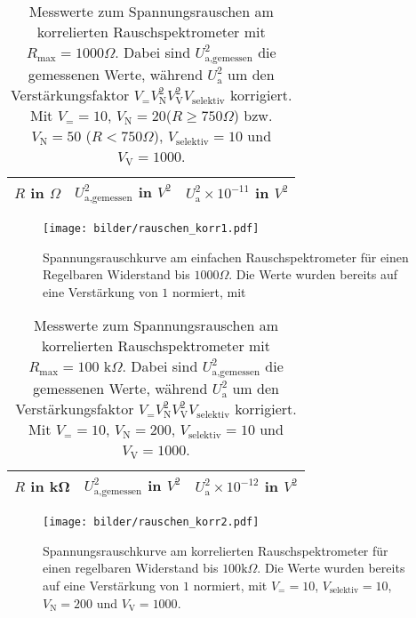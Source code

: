 		\begin{table}[h]
			\centering
			\begin{tabular}{ccc}
				\toprule \midrule
				$R$ in $\Omega$ & $U_\text{a,gemessen}^2$ in $V^2$
				& $U_\text{a}^2 \times 10^{-11}$ in $V^2$\\
				\midrule
				
				\midrule \bottomrule
			\end{tabular}
			\caption{Messwerte zum Spannungsrauschen am korrelierten
			Rauschspektrometer mit $R_\text{max}=1000 \Omega$. Dabei sind
			$U_\text{a,gemessen}^2$ die gemessenen Werte, während $U_\text{a}^2$ um den
			Verstärkungsfaktor $V_= V_\text{N}^2 V_\text{V}^2 V_\text{selektiv}$ korrigiert.
			Mit $V_= =10$, $V_\text{N}=20$($R\geq 750\Omega$) bzw. $V_\text{N}=50$
			($R<750\Omega$), $V_\text{selektiv}=10$ und $V_\text{V}=1000$. }
			\label{tab:rauschen_korr1}
	\end{table}

	\begin{figure}[h]
			\centering
			\texttt{[image: bilder/rauschen\_korr1.pdf]}
			\caption{Spannungsrauschkurve am einfachen Rauschspektrometer für einen
			Regelbaren Widerstand bis $1000\Omega$. Die Werte wurden bereits auf eine Verstärkung von
			$1$ normiert, mit}
			\label{fig:rauschen_korr1}
	\end{figure}



	\begin{table}[h]
			\centering
			\begin{tabular}{ccc}
				\toprule \midrule
				$R$ in \si{\kilo\ohm} & $U_\text{a,gemessen}^2$ in $V^2$
				&$U_\text{a}^2 \times 10^{-12}$ in $V^2$ \\
				\midrule
				
				\midrule \bottomrule
			\end{tabular}
			\caption{Messwerte zum Spannungsrauschen am korrelierten
			Rauschspektrometer mit $R_\text{max}=100 \text{ k}\Omega$. Dabei sind
			$U_\text{a,gemessen}^2$ die gemessenen Werte, während $U_\text{a}^2$ um den
			Verstärkungsfaktor $V_= V_\text{N}^2 V_\text{V}^2 V_\text{selektiv}$ korrigiert.
			Mit $V_= =10$, $V_\text{N}=200$, $V_\text{selektiv}=10$ und $V_\text{V}=1000$.}
			\label{tab:rauschen_korr2}
	\end{table}

	\begin{figure}[h]
			\centering
			\texttt{[image: bilder/rauschen\_korr2.pdf]}
			\caption{Spannungsrauschkurve am korrelierten Rauschspektrometer für einen
			regelbaren Widerstand bis $100\text{k}\Omega$. Die Werte wurden bereits auf eine
			Verstärkung von 	$1$ normiert, mit $V_= =10$, $V_\text{selektiv}=10$, $V_\text{N}=200$ und
			$V_\text{V}=1000$. }
			\label{fig:rauschen_korr2}
	\end{figure}

